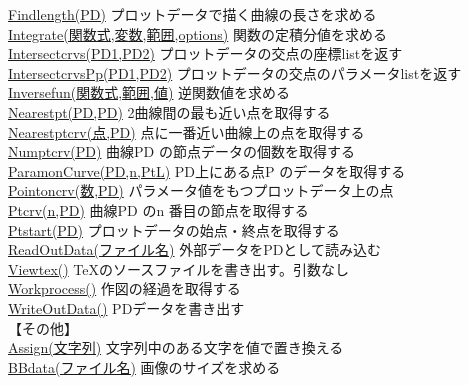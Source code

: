 \documentclass[papersize,a4paper,12pt,uplatex]{jsarticle}
\begin{document}
\begin{tabbing}
\hyperlink{findlength}{Findlength(PD)}  \>プロットデータで描く曲線の長さを求める\\
\hyperlink{integrate}{Integrate(関数式,変数,範囲,options)}   \>関数の定積分値を求める\\
\hyperlink{intersectcrvs}{Intersectcrvs(PD1,PD2)}    \>プロットデータの交点の座標listを返す\\
\hyperlink{intersectcrvspp}{IntersectcrvsPp(PD1,PD2)}    \>プロットデータの交点のパラメータlistを返す\\
\hyperlink{inversefun}{Inversefun(関数式,範囲,値)}  \>逆関数値を求める\\
\hyperlink{nearestpt}{Nearestpt(PD,PD)}  \>2曲線間の最も近い点を取得する\\
\hyperlink{nearestptcrv}{Nearestptcrv(点,PD)}  \>点に一番近い曲線上の点を取得する\\
\hyperlink{numptcrv}{Numptcrv(PD)}    \>曲線PD の節点データの個数を取得する\\
\hyperlink{paramoncrv}{ParamonCurve(PD,n,PtL)}  \>PD上にある点P のデータを取得する\\
\hyperlink{pointoncrv}{Pointoncrv(数,PD)}  \>パラメータ値をもつプロットデータ上の点\\
\hyperlink{ptcrv}{Ptcrv(n,PD)}  \>曲線PD のn 番目の節点を取得する\\
\hyperlink{ptstart}{Ptstart(PD)}      \>プロットデータの始点・終点を取得する\\
\hyperlink{readoutdata}{ReadOutData(ファイル名)}  \>外部データをPDとして読み込む\\
\hyperlink{viewtex}{Viewtex()}  \>\TeX のソースファイルを書き出す。引数なし\\
\hyperlink{workprocess}{Workprocess()}  \>作図の経過を取得する\\
\hyperlink{writeoutdata}{WriteOutData()}  \>PDデータを書き出す\\
\vspace{\baselineskip}
【その他】\\
\hyperlink{assign}{Assign(文字列)}    \>文字列中のある文字を値で置き換える\\
\hyperlink{bbdata}{BBdata(ファイル名)}    \>画像のサイズを求める\\

\end{tabbing}
\end{document}
